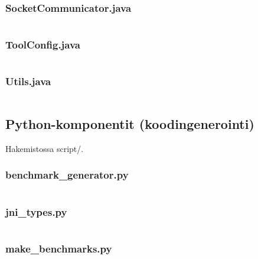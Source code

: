 \documentclass[a4paper,12pt]{article}
\begin{document}
\subsubsection{SocketCommunicator.java}
\inputminted[fontsize=\small, linenos, numbersep=5pt, tabsize=4, frame=topline,framesep=0.8cm]{java}{/home/tituomin/StudioProjects/nativebenchmark/src/fi/helsinki/cs/tituomin/nativebenchmark/SocketCommunicator.java}
\vspace{1cm}
\subsubsection{ToolConfig.java}
\inputminted[fontsize=\small, linenos, numbersep=5pt, tabsize=4, frame=topline,framesep=0.8cm]{java}{/home/tituomin/StudioProjects/nativebenchmark/src/fi/helsinki/cs/tituomin/nativebenchmark/ToolConfig.java}
\vspace{1cm}
\subsubsection{Utils.java}
\inputminted[fontsize=\small, linenos, numbersep=5pt, tabsize=4, frame=topline,framesep=0.8cm]{java}{/home/tituomin/StudioProjects/nativebenchmark/src/fi/helsinki/cs/tituomin/nativebenchmark/Utils.java}
\newpage
\subsection{Python-komponentit (koodingenerointi)}
Hakemistossa script/.
\vspace{1cm}
\subsubsection{benchmark\_generator.py}
\inputminted[fontsize=\small, linenos, numbersep=5pt, tabsize=4, frame=topline,framesep=0.8cm]{python}{/home/tituomin/StudioProjects/nativebenchmark/script/benchmark_generator.py}
\vspace{1cm}
\subsubsection{jni\_types.py}
\inputminted[fontsize=\small, linenos, numbersep=5pt, tabsize=4, frame=topline,framesep=0.8cm]{python}{/home/tituomin/StudioProjects/nativebenchmark/script/jni_types.py}
\vspace{1cm}
\subsubsection{make\_benchmarks.py}
\inputminted[fontsize=\small, linenos, numbersep=5pt, tabsize=4, frame=topline,framesep=0.8cm]{python}{/home/tituomin/StudioProjects/nativebenchmark/script/make_benchmarks.py}
\vspace{1cm}
\end{document}
